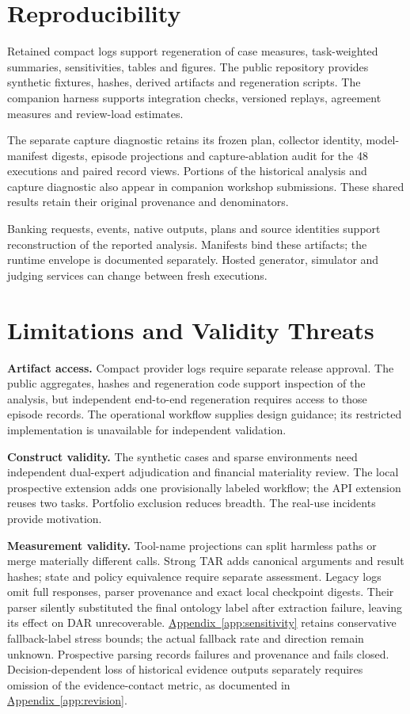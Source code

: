 \documentclass{article}
\begin{document}
\section{Reproducibility}

Retained compact logs support regeneration of case measures, task-weighted
summaries, sensitivities, tables and figures. The public repository provides
synthetic fixtures, hashes, derived artifacts and regeneration scripts.
The companion harness supports
integration checks, versioned replays, agreement measures and review-load estimates.

The separate capture diagnostic retains its frozen plan, collector identity,
model-manifest digests, episode projections and capture-ablation audit for the
48 executions and paired record views.
Portions of the historical analysis and capture diagnostic also appear in
companion workshop submissions. These shared results retain their original
provenance and denominators.

Banking requests, events, native outputs, plans and source identities support
reconstruction of the reported analysis. Manifests bind these artifacts; the
runtime envelope is documented separately. Hosted generator, simulator and
judging services can change between fresh executions.

\section{Limitations and Validity Threats}

\textbf{Artifact access.} Compact provider logs require separate release
approval. The public aggregates, hashes and regeneration code support inspection
of the analysis, but independent end-to-end regeneration requires access to
those episode records. The operational workflow supplies design guidance;
its restricted implementation is unavailable for independent validation.

\textbf{Construct validity.} The synthetic cases and sparse environments need
independent dual-expert adjudication and financial materiality review. The local
prospective extension adds one provisionally labeled workflow; the API extension
reuses two tasks. Portfolio exclusion reduces breadth. The real-use incidents
provide motivation.

\textbf{Measurement validity.} Tool-name projections can split harmless paths
or merge materially different calls. Strong TAR adds canonical arguments and
result hashes; state and policy equivalence require separate assessment.
Legacy logs omit full responses, parser provenance and exact local checkpoint
digests. Their parser silently substituted the final ontology label after
extraction failure, leaving its effect on DAR unrecoverable.
\hyperref[app:sensitivity]{Appendix~\ref*{app:sensitivity}} retains conservative
fallback-label stress bounds; the actual fallback rate and direction remain
unknown.
Prospective parsing records failures and provenance and fails closed.
Decision-dependent loss of historical evidence outputs separately requires
omission of the evidence-contact metric, as documented in
\hyperref[app:revision]{Appendix~\ref*{app:revision}}.
\end{document}
